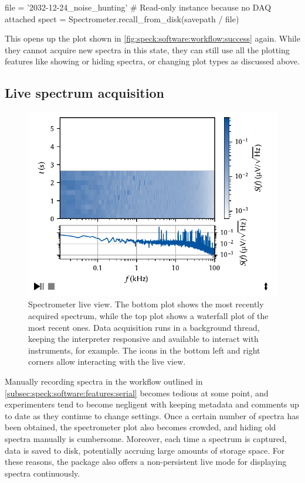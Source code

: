 \begin{pycode}
    file = '2032-12-24_noise_hunting'
    # Read-only instance because no DAQ attached
    spect = Spectrometer.recall_from_disk(savepath / file)
\end{pycode}

This opens up the plot shown in \cref{fig:speck:software:workflow:success} again.
While they cannot acquire new spectra in this state,
they can still use all the plotting features like showing or hiding spectra, or changing plot types as discussed above.

\subsection{Live spectrum acquisition}\label{subsec:speck:software:features:live_view}
\begin{figure}
    \centering
    \includegraphics{img/pdf/spectrometer/live_view}
    \caption[]{
        Spectrometer live view.
        The bottom plot shows the most recently acquired spectrum, while the top plot shows a waterfall plot of the most recent ones.
        Data acquisition runs in a background thread, keeping the interpreter responsive and available to interact with instruments, for example.
        The icons in the bottom left and right corners allow interacting with the live view.
    }
    \label{fig:speck:software:live_view}
\end{figure}
Manually recording spectra in the workflow outlined in \cref{subsec:speck:software:features:serial} becomes tedious at some point, and experimenters tend to become negligent with keeping metadata and comments up to date as they continue to change settings.
Once a certain number of spectra has been obtained, the spectrometer plot also becomes crowded, and hiding old spectra manually is cumbersome.
Moreover, each time a spectrum is captured, data is saved to disk, potentially accruing large amounts of storage space.
For these reasons, the \pyspeck package also offers a non-persistent live mode for displaying spectra continuously.

